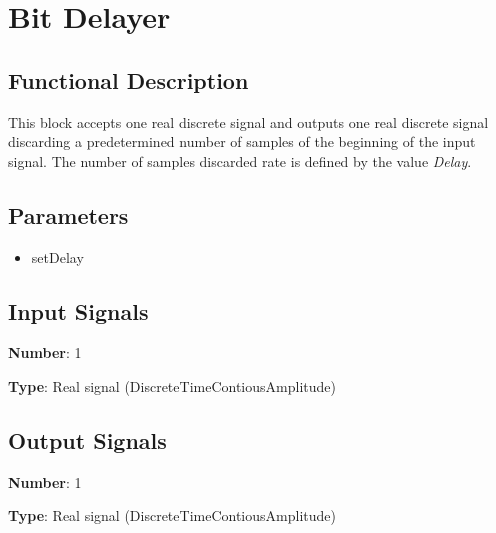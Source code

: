\section{Bit Delayer}

\subsection*{Functional Description}

This block accepts one real discrete signal and outputs one real discrete signal discarding a predetermined number of samples of the beginning of the input signal. The number of samples discarded rate is defined by the value \textit{Delay}.

\subsection*{Parameters}

\begin{multicols}{2}
	\begin{itemize}
		\item setDelay
	\end{itemize}
\end{multicols}

\subsection*{Input Signals}

\textbf{Number}: 1

\textbf{Type}: Real signal (DiscreteTimeContiousAmplitude)

\subsection*{Output Signals}

\textbf{Number}: 1

\textbf{Type}: Real signal (DiscreteTimeContiousAmplitude)